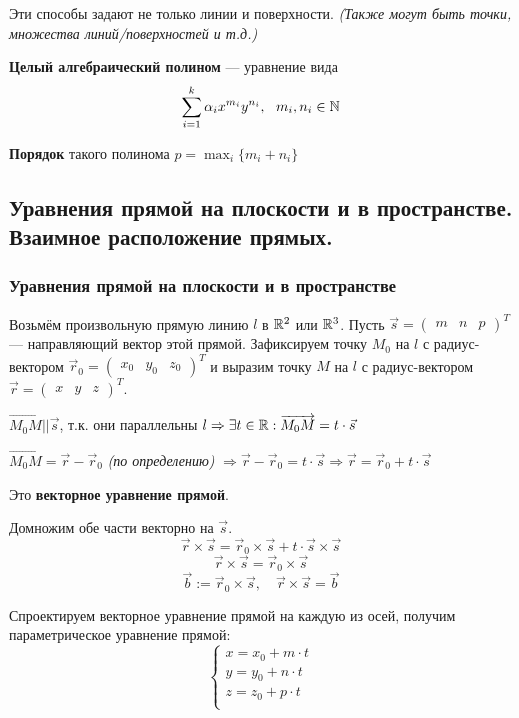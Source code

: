 Эти способы задают не только линии и поверхности. \textit{(Также могут быть точки, множества линий/поверхностей и т.д.)}

\begin{definition}
    \textbf{Целый алгебраический полином} --- уравнение вида $$\sum\limits_{i=1}^k\alpha_ix^{m_i}y^{n_i},\ \ m_i,n_i\in\N$$

    \textbf{Порядок} такого полинома $p=\max_{i}\{m_i+n_i\}$
\end{definition}

\subsection{Уравнения прямой на плоскости и в пространстве. Взаимное расположение прямых.}
\subsubsection{Уравнения прямой на плоскости и в пространстве}
Возьмём произвольную прямую линию $l$ в $\mathbb{R}^2$ или $\mathbb{R}^3$. Пусть $\vec s=\begin{pmatrix} m & n & p\end{pmatrix}^T$ --- направляющий вектор этой прямой. Зафиксируем точку $M_0$ на $l$ с радиус-вектором $\vec r_0=\begin{pmatrix}x_0&y_0&z_0\end{pmatrix}^T$ и выразим точку $M$ на $l$ с радиус-вектором $\vec r=\begin{pmatrix}x&y&z\end{pmatrix}^T$.

$\overrightarrow{M_0M} || \vec s$, т.к. они параллельны $l \Rightarrow \exists t\in\mathbb{R}:\overrightarrow{M_0M}=t\cdot\vec s$

$\overrightarrow{M_0M}=\vec r-\vec r_0$ \textit{(по определению)} $\Rightarrow \vec r-\vec r_0=t\cdot\vec s\Rightarrow \vec r=\vec r_0+t\cdot \vec s$

\begin{definition}
    Это \textbf{векторное уравнение прямой}.
\end{definition}

Домножим обе части векторно на $\vec s$.
$$\vec r\times\vec s=\vec r_0\times\vec s+t\cdot\vec s\times\vec s$$
$$\vec r\times\vec s=\vec r_0\times\vec s$$
$$\vec b:=\vec r_0\times\vec s, \quad \vec r\times\vec s=\vec b$$

Спроектируем векторное уравнение прямой на каждую из осей, получим параметрическое уравнение прямой:
$$\begin{cases}
        x=x_0+m\cdot t \\
        y=y_0+n\cdot t \\
        z=z_0+p\cdot t \\
    \end{cases}$$

